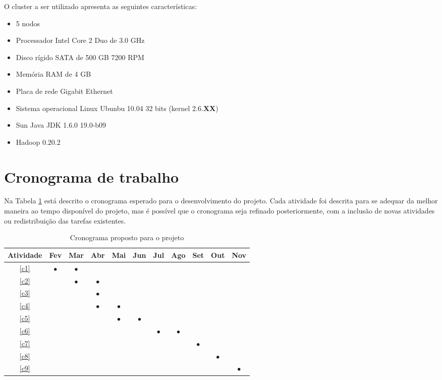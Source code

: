 O cluster a ser utilizado apresenta as seguintes características:
\begin{itemize}
\item 5 nodos
\item Processador Intel Core 2 Duo de 3.0 GHz
\item Disco rígido SATA de 500 GB 7200 RPM
\item Memória RAM de 4 GB
\item Placa de rede Gigabit Ethernet
\item Sistema operacional Linux Ubunbu 10.04 32 bits (kernel 2.6.\textbf{XX})
\item Sun Java JDK 1.6.0 19.0-b09 
\item Hadoop 0.20.2
\end{itemize}

\section{Cronograma de trabalho}

Na Tabela \ref{tab:cronograma} está descrito o cronograma esperado para o desenvolvimento do projeto. Cada atividade foi descrita para se adequar da melhor maneira ao tempo disponível do projeto, mas é possível que o cronograma seja refinado posteriormente, com a inclusão de novas atividades ou redistribuição das tarefas existentes. 

\begin{table}[h]

\renewcommand{\arraystretch}{1}
\setlength\tabcolsep{3pt}
\begin{center}
\begin{tabular}{| c | c | c | c | c | c | c | c | c | c | c |}
\hline

Atividade &Fev &Mar &Abr &Mai &Jun &Jul &Ago &Set &Out &Nov \\ \hline \hline
\ref{c1}   &$\bullet$ &$\bullet$ & & & & & & & & \\ \hline
\ref{c2}   & &$\bullet$ &$\bullet$ & & & & & & & \\ \hline
\ref{c3}   & & &$\bullet$ & & & & & & & \\ \hline
\ref{c4}   & & &$\bullet$ &$\bullet$ & & & & & & \\ \hline
\ref{c5}   & & & &$\bullet$ &$\bullet$ & & & & & \\ \hline
\ref{c6}   & & & & & &$\bullet$ &$\bullet$ & & & \\ \hline
\ref{c7}   & & & & & & & &$\bullet$ & & \\ \hline
\ref{c8}   & & & & & & & & &$\bullet$ & \\ \hline
\ref{c9}   & & & & & & & & & &$\bullet$ \\ \hline
\hline
\end{tabular}
\end{center}
\caption{Cronograma proposto para o projeto}
\label{tab:cronograma}
\end{table}

